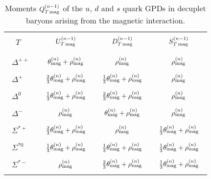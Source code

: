 \documentclass[preprintnumbers,prd,superscriptaddress,preprint]{revtex4-1}
\begin{document}
\begin{table}[b]
\begin{center}
\caption{Moments $Q^{(n-1)}_{T\,\rm mag}$ of the $u$, $d$ and $s$ quark GPDs in decuplet baryons arising from the magnetic interaction.\\}
\begin{tabular}{l|c|c|c} \hline
& & &
\\
~~$T$ & 
$U^{(n-1)}_{T\,\rm mag}$ &
$D^{(n-1)}_{T\,\rm mag}$ &
$S^{(n-1)}_{T\,\rm mag}$
\\ 
& & &
\\ \hline
& & &
\\
~$\Delta^{++}$~ & 
$\theta_{\rm mag}^{(n)}+\rho_{\rm mag}^{(n)}$ &
$\rho_{\rm mag}^{(n)}$ & $\rho_{\rm mag}^{(n)}$ 
\\
& & &
\\
~$\Delta^+$ &
$\frac23\theta_{\rm mag}^{(n)}+\rho_{\rm mag}^{(n)}$ & 
$\frac13\theta_{\rm mag}^{(n)}+\rho_{\rm mag}^{(n)}$ &
$\rho_{\rm mag}^{(n)}$ 
\\
& & &
\\
~$\Delta^0$ &
$\frac13\theta_{\rm mag}^{(n)}+\rho_{\rm mag}^{(n)}$ & 
$\frac23\theta_{\rm mag}^{(n)}+\rho_{\rm mag}^{(n)}$ & 
$\rho_{\rm mag}^{(n)}$ 
\\
& & &
\\
~$\Delta^-$ & 
$\rho_{\rm mag}^{(n)}$ & 
$\theta_{\rm mag}^{(n)}+\rho_{\rm mag}^{(n)}$ & 
$\rho_{\rm mag}^{(n)}$ 
\\
& & &
\\
~$\Sigma^{*+}$ &
$\frac23\theta_{\rm mag}^{(n)}+\rho_{\rm mag}^{(n)}$ & 
$\rho_{\rm mag}^{(n)}$ &
$\frac13\theta_{\rm mag}^{(n)}+\rho_{\rm mag}^{(n)}$
\\
& & &
\\
~$\Sigma^{*0}$ & 
~$\frac13\theta_{\rm mag}^{(n)}+\rho_{\rm mag}^{(n)}$~ &
~$\frac13\theta_{\rm mag}^{(n)}+\rho_{\rm mag}^{(n)}$~ & 
~$\frac13\theta_{\rm mag}^{(n)}+\rho_{\rm mag}^{(n)}$~ 
\\
& & &
\\
~$\Sigma^{*-}$ & 
$\rho_{\rm mag}^{(n)}$ &
$\frac23\theta_{\rm mag}^{(n)}+\rho_{\rm mag}^{(n)}$ &
$\frac13\theta_{\rm mag}^{(n)}+\rho_{\rm mag}^{(n)}$ 
\\
& & &
\\ \hline
\end{tabular}
\label{tab:TT}
\end{center}
\end{table}
\end{document}
